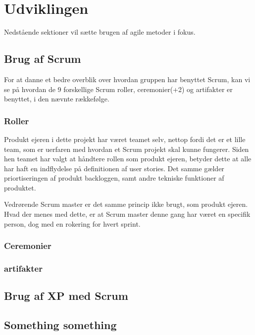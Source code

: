 \chapter{Udviklingen}\label{ch:Udviklingen}

Nedstående sektioner vil sætte brugen af agile metoder i fokus. 

\section{Brug af Scrum}

For at danne et bedre overblik over hvordan gruppen har benyttet Scrum, kan vi se på hvordan de 9 forskellige Scrum roller, ceremonier(+2) og artifakter er benyttet, i den nævnte rækkefølge.

\subsection{Roller}

Produkt ejeren i dette projekt har været teamet selv, nettop fordi det er et lille team, som er uerfaren med hvordan et Scrum projekt skal kunne fungerer. Siden hen teamet har valgt at håndtere rollen som produkt ejeren, betyder dette at alle har haft en indflydelse på definitionen af user stories. Det samme gælder priortiseringen af produkt backloggen, samt andre tekniske funktioner af produktet. 

Vedrørende Scrum master er det samme princip ikke brugt, som produkt ejeren. Hvad der menes med dette, er at Scrum master denne gang har været en specifik person, dog med en rokering for hvert sprint. 



\subsection{Ceremonier}


\subsection{artifakter}





\section{Brug af XP med Scrum}



\section{Something something}